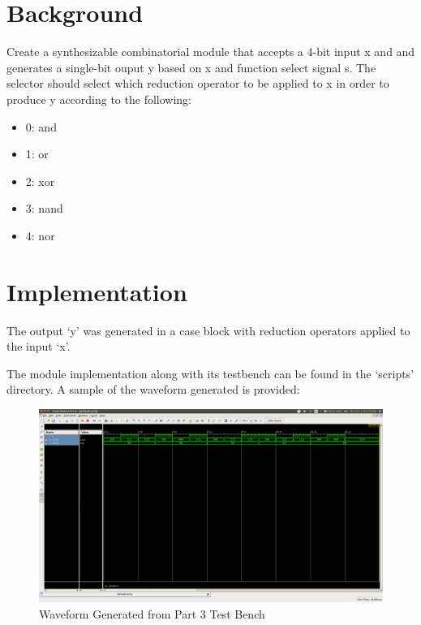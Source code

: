 \documentclass[paper=usletter, fontsize=12pt]{article}
\begin{document}
    \vspace{-0.1in}

    \section{Background}
    Create a synthesizable combinatorial module that accepts a 4-bit input x and and generates a single-bit ouput y based on x and function select signal s. The selector should select which reduction operator to be applied to x in order to produce y according to the following:

    \begin{itemize}
        \item 0: and
        \item 1: or
        \item 2: xor
        \item 3: nand
        \item 4: nor
    \end{itemize}

    \section{Implementation}
    The output `y' was generated in a case block with reduction operators applied to the input `x'.

    The module implementation along with its testbench can be found in the `scripts' directory. A sample of the waveform generated is provided:

    \begin{figure}[ht]
        \begin{center}
            \includegraphics[width=1\textwidth]{wav.png}
            \caption{Waveform Generated from Part 3 Test Bench} \label{fig:wav}
        \end{center}
    \end{figure}
\end{document}
